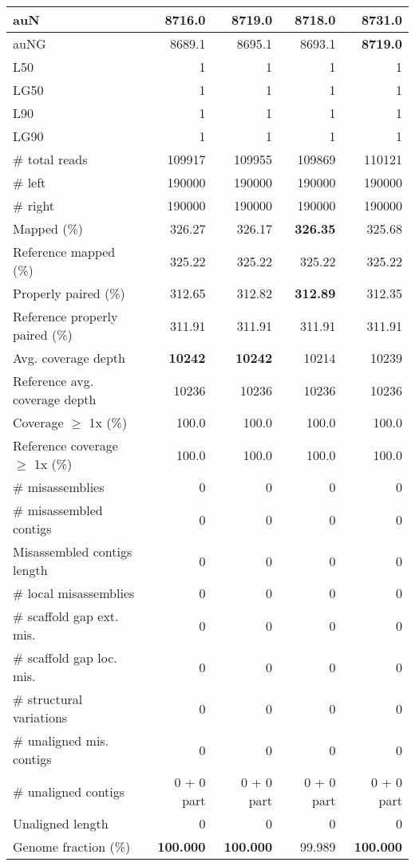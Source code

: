 \documentclass[12pt,a4paper]{article}
\begin{document}
\begin{table}[ht]
\begin{center}
\begin{tabular}{|l*{4}{|r}|}
auN & 8716.0 & 8719.0 & 8718.0 & {\bf 8731.0} \\ \hline
auNG & 8689.1 & 8695.1 & 8693.1 & {\bf 8719.0} \\ \hline
L50 & 1 & 1 & 1 & 1 \\ \hline
LG50 & 1 & 1 & 1 & 1 \\ \hline
L90 & 1 & 1 & 1 & 1 \\ \hline
LG90 & 1 & 1 & 1 & 1 \\ \hline
\# total reads & 109917 & 109955 & 109869 & 110121 \\ \hline
\# left & 190000 & 190000 & 190000 & 190000 \\ \hline
\# right & 190000 & 190000 & 190000 & 190000 \\ \hline
Mapped (\%) & 326.27 & 326.17 & {\bf 326.35} & 325.68 \\ \hline
Reference mapped (\%) & 325.22 & 325.22 & 325.22 & 325.22 \\ \hline
Properly paired (\%) & 312.65 & 312.82 & {\bf 312.89} & 312.35 \\ \hline
Reference properly paired (\%) & 311.91 & 311.91 & 311.91 & 311.91 \\ \hline
Avg. coverage depth & {\bf 10242} & {\bf 10242} & 10214 & 10239 \\ \hline
Reference avg. coverage depth & 10236 & 10236 & 10236 & 10236 \\ \hline
Coverage $\geq$ 1x (\%) & 100.0 & 100.0 & 100.0 & 100.0 \\ \hline
Reference coverage $\geq$ 1x (\%) & 100.0 & 100.0 & 100.0 & 100.0 \\ \hline
\# misassemblies & 0 & 0 & 0 & 0 \\ \hline
\# misassembled contigs & 0 & 0 & 0 & 0 \\ \hline
Misassembled contigs length & 0 & 0 & 0 & 0 \\ \hline
\# local misassemblies & 0 & 0 & 0 & 0 \\ \hline
\# scaffold gap ext. mis. & 0 & 0 & 0 & 0 \\ \hline
\# scaffold gap loc. mis. & 0 & 0 & 0 & 0 \\ \hline
\# structural variations & 0 & 0 & 0 & 0 \\ \hline
\# unaligned mis. contigs & 0 & 0 & 0 & 0 \\ \hline
\# unaligned contigs & 0 + 0 part & 0 + 0 part & 0 + 0 part & 0 + 0 part \\ \hline
Unaligned length & 0 & 0 & 0 & 0 \\ \hline
Genome fraction (\%) & {\bf 100.000} & {\bf 100.000} & 99.989 & {\bf 100.000} \\ \hline

\end{tabular}
\end{center}
\end{table}
\end{document}
